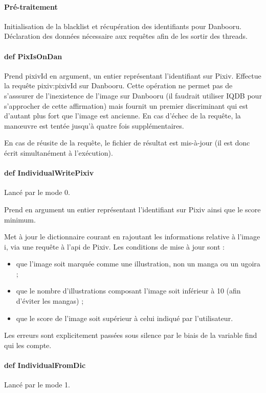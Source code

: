 \documentclass[a4paper,12pt]{article}
\begin{document}
\paragraph{Pré-traitement}
Initialisation de la blacklist et récupération des identifiants pour Danbooru. Déclaration des données nécessaire aux requêtes afin de les sortir des threads.
\paragraph{def PixIsOnDan}
Prend pixivId en argument, un entier représentant l'identifiant sur Pixiv. Effectue la requête pixiv:pixivId sur Danbooru. Cette opération ne permet pas de s'asssurer de l'inexistence de l'image sur Danbooru (il faudrait utiliser IQDB pour s'approcher de cette affirmation) mais fournit un premier discriminant qui est d'autant plus fort que l'image est ancienne. En cas d'échec de la requête, la manœuvre est tentée jusqu'à quatre fois supplémentaires.

En cas de réusite de la requête, le fichier de résultat est mis-à-jour (il est donc écrit simultanément à l'exécution).
\paragraph{def IndividualWritePixiv}
Lancé par le mode 0.

Prend en argument un entier représentant l'identifiant sur Pixiv ainsi que le score minimum.

Met à jour le dictionnaire courant en rajoutant les informations relative à l'image i, via une requête à l'api de Pixiv.
Les conditions de mise à jour sont :
\begin{itemize}
\item que l'image soit marquée comme une illustration, non un manga ou un ugoira ; 
\item que le nombre d'illustrations composant l'image soit inférieur à 10 (afin d'éviter les mangas) ;
\item que le score de l'image soit supérieur à celui indiqué par l'utilisateur.
\end{itemize}

Les erreurs sont explicitement passées sous silence par le biais de la variable \og find \fg{} qui les compte.
\paragraph{def IndividualFromDic}
Lancé par le mode 1.
\end{document}
